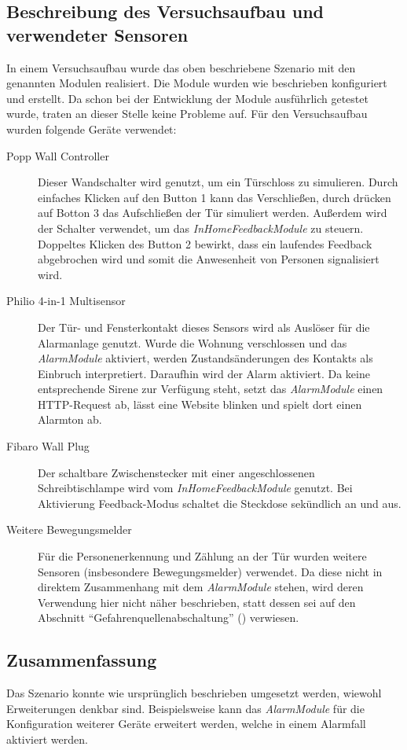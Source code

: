 \subsection{Beschreibung des Versuchsaufbau und verwendeter Sensoren}
In einem Versuchsaufbau wurde das oben beschriebene Szenario mit den genannten Modulen realisiert. Die Module wurden wie beschrieben konfiguriert und erstellt. Da schon bei der Entwicklung der Module ausführlich getestet wurde, traten an dieser Stelle keine Probleme auf.
Für den Versuchsaufbau wurden folgende Geräte verwendet:

\begin{description}
	\item [Popp Wall Controller] Dieser Wandschalter wird genutzt, um ein Türschloss zu simulieren. Durch einfaches Klicken auf den Button 1 kann das Verschließen, durch drücken auf Botton 3 das Aufschließen der Tür simuliert werden. Außerdem wird der Schalter verwendet, um das \emph{InHomeFeedbackModule} zu steuern. Doppeltes Klicken des Button 2 bewirkt, dass ein laufendes Feedback abgebrochen wird und somit die Anwesenheit von Personen signalisiert wird.
	
	\item [Philio 4-in-1 Multisensor] Der Tür- und Fensterkontakt dieses Sensors wird als Auslöser für die Alarmanlage genutzt. Wurde die Wohnung verschlossen und das \emph{AlarmModule} aktiviert, werden Zustandsänderungen des Kontakts als Einbruch interpretiert. Daraufhin wird der Alarm aktiviert. Da keine entsprechende Sirene zur Verfügung steht, setzt das \emph{AlarmModule} einen HTTP-Request ab, lässt eine Website blinken und spielt dort einen Alarmton ab.
	
	\item [Fibaro Wall Plug] Der schaltbare Zwischenstecker mit einer angeschlossenen Schreibtischlampe wird vom \emph{InHomeFeedbackModule} genutzt. Bei Aktivierung Feedback-Modus schaltet die Steckdose sekündlich an und aus.
	
	\item [Weitere Bewegungsmelder] Für die Personenerkennung und Zählung an der Tür wurden weitere Sensoren (insbesondere Bewegungsmelder) verwendet. Da diese nicht in direktem Zusammenhang mit dem \emph{AlarmModule} stehen, wird deren Verwendung hier nicht näher beschrieben, statt dessen sei auf den Abschnitt "`Gefahrenquellenabschaltung"' () verwiesen.
\end{description}
\subsection{Zusammenfassung}
Das Szenario konnte wie ursprünglich beschrieben umgesetzt werden, wiewohl Erweiterungen denkbar sind. Beispielsweise kann das \emph{AlarmModule} für die Konfiguration weiterer Geräte erweitert werden, welche in einem Alarmfall aktiviert werden.

